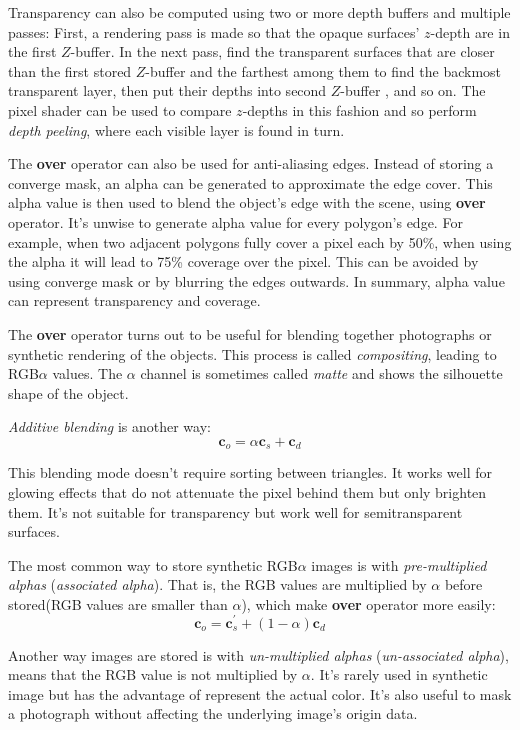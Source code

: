 \documentclass[10pt, a4paper]{article}
\begin{document}
            Transparency can also be computed using two or more depth buffers and multiple passes: First, a rendering pass is made so that the opaque surfaces' $z$-depth are in the first $Z$-buffer. In the next pass, find the transparent surfaces that are closer than the first stored $Z$-buffer and the farthest among them to find the backmost transparent layer, then put their depths into second $Z$-buffer , and so on. The pixel shader can be used to compare $z$-depths in this fashion and so perform \emph{depth peeling}, where each visible layer is found in turn. 

            The \textbf{over} operator can also be used for anti-aliasing edges. Instead of storing a converge mask, an alpha can be generated to approximate the edge cover. This alpha value is then used to blend the object's edge with the scene, using \textbf{over} operator. It's unwise to generate alpha value for every polygon's edge. For example, when two adjacent polygons fully cover a pixel each by 50\%, when using the alpha it will lead to 75\% coverage over the pixel. This can be avoided by using converge mask or by blurring the edges outwards. In summary, alpha value can represent transparency and coverage. 
            
            The \textbf{over} operator turns out to be useful for blending together photographs or synthetic rendering of the objects. This process is called \emph{compositing}, leading to RGB$\alpha$ values. The $\alpha$ channel is sometimes called \emph{matte} and shows the silhouette shape of the object. 
            
            \emph{Additive blending} is another way: 
                $$\textbf{c}_o = \alpha\textbf{c}_s + \textbf{c}_d$$

            This blending mode doesn't require sorting between triangles. It works well for glowing effects that do not attenuate the pixel behind them but only brighten them. It's not suitable for transparency but work well for semitransparent surfaces. 

            The most common way to store synthetic RGB$\alpha$ images is with \emph{pre-multiplied alphas} (\emph{associated alpha}). That is, the RGB values are multiplied by $\alpha$ before stored(RGB values are smaller than $\alpha$), which make \textbf{over} operator more easily: 
                $$\textbf{c}_o = \textbf{c}_s^{'} + (1 - \alpha)\textbf{c}_d$$

            Another way images are stored is with \emph{un-multiplied alphas} (\emph{un-associated alpha}), means that the RGB value is not multiplied by $\alpha$. It's rarely used in synthetic image but has the advantage of represent the actual color. It's also useful to mask a photograph without affecting the underlying image's origin data. 
\end{document}
